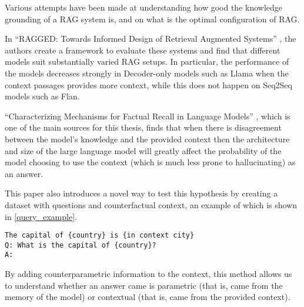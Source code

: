 Various attempts have been made at understanding how good the knowledge grounding of a RAG system is, and on what is the optimal configuration of RAG.

In ``RAGGED: Towards Informed Design of Retrieval Augmented Systems'' \citep{ragged}, the authors create a framework to evaluate these systems and find that different models suit substantially varied RAG setups.
In particular, the performance of the models decreases strongly in Decoder-only models such as Llama when the context passages provides more context, while this does not happen on Seq2Seq models such as Flan.

``Characterizing Mechanisms for Factual Recall in Language Models'' \citep{factual_recall}, which is one of the main sources for this thesis, finds that when there is disagreement between the model's knowledge and the provided context then the architecture and size of the large language model will greatly affect the probability of the model choosing to use the context (which is much less prone to hallucinating) as an answer.

This paper also introduces a novel way to test this hypothesis by creating a dataset with questions and counterfactual context, an example of which is shown in \cref{query_example}.

\begin{lstlisting}[caption={Example of queries used in \citep{factual_recall}. These queries form the basis and inspiration for the dataset creation done in this thesis}, label={query_example},basicstyle=\ttfamily\small,keywordstyle=\rmfamily\bfseries,keywords={country,in,context,city},captionpos=b,frame=single,breaklines=true,xrightmargin=.15\textwidth,xleftmargin=.15\textwidth,float=h]
The capital of {country} is {in context city}
Q: What is the capital of {country}?
A:
\end{lstlisting}

By adding counterparametric information to the context, this method allows us to understand whether an answer came is parametric (that is, came from the memory of the model) or contextual (that is, came from the provided context).
